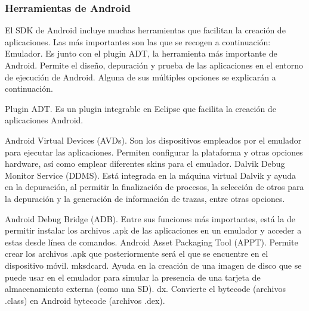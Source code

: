 \documentclass[12 pt, a4paper, twoside]{article}
\begin{document}
\subsubsection{Herramientas de Android}
El SDK de Android incluye muchas herramientas que facilitan la creación de
aplicaciones. Las más importantes son las que se recogen a continuación:
Emulador. Es junto con el plugin ADT, la herramienta más importante
de Android. Permite el diseño, depuración y prueba de las aplicaciones en
el entorno de ejecución de Android. Alguna de sus múltiples opciones se
explicarán a continuación.

Plugin ADT. Es un plugin integrable en Eclipse que facilita la creación de
aplicaciones Android.

Android Virtual Devices (AVDs). Son los dispositivos empleados por el
emulador para ejecutar las aplicaciones. Permiten configurar la plataforma y
otras opciones hardware, así como emplear diferentes skins para el emulador.
Dalvik Debug Monitor Service (DDMS). Está integrada en la máquina virtual
Dalvik y ayuda en la depuración, al permitir la finalización de procesos,
la selección de otros para la depuración y la generación de información de
trazas, entre otras opciones.

Android Debug Bridge (ADB). Entre sus funciones más importantes, está
la de permitir instalar los archivos .apk de las aplicaciones en un emulador y
acceder a estas desde línea de comandos.
Android Asset Packaging Tool (APPT). Permite crear los archivos .apk
que posteriormente será el que se encuentre en el dispositivo móvil.
mksdcard. Ayuda en la creación de una imagen de disco que se puede usar
en el emulador para simular la presencia de una tarjeta de almacenamiento
externa (como una SD).
dx. Convierte el bytecode (archivos .class) en Android bytecode (archivos
.dex).

\end{document}
